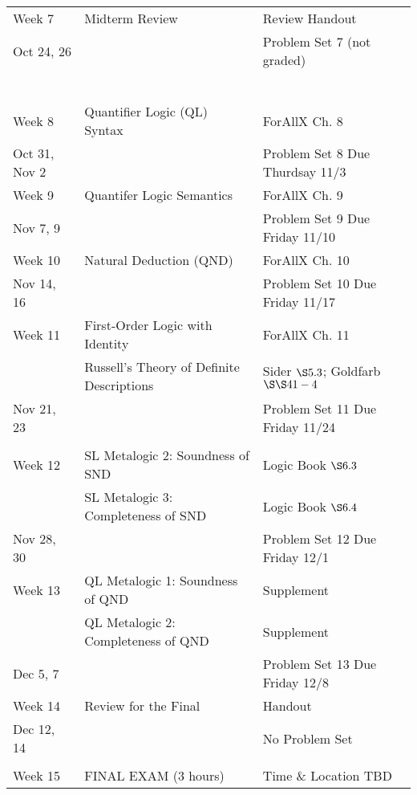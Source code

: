 \documentclass[letterpaper]{inzane_syllabus} %
\begin{document}
\begin{center}
\begin{tabularx}{\textwidth}{p{2.5cm}p{8cm}p{9cm}}
Week 7 & Midterm Review & Review Handout \\
Oct 24, 26 & &  Problem Set 7 (not graded) \\
~\\

\arrayrulecolor{myCOLOR}\hline

\multicolumn{2}{l}{\textbf{\textcolor{myCOLOR}{\large Part 2: Quantifer Logic (QL) }}} \\
\hline

Week 8 & Quantifier Logic (QL) Syntax & ForAllX Ch. 8 \\
Oct 31, Nov 2 & & Problem Set 8 Due Thurdsay 11/3 \\
\arrayrulecolor{maingray}\hline
 
Week 9 & Quantifer Logic Semantics & ForAllX Ch. 9 \\
Nov 7, 9 & & Problem Set 9 Due Friday 11/10 \\
\arrayrulecolor{maingray}\hline

Week 10 & Natural Deduction (QND) & ForAllX Ch. 10 \\
Nov 14, 16 & & Problem Set 10 Due Friday 11/17 \\
\arrayrulecolor{maingray}\hline

Week 11 & First-Order Logic with Identity & ForAllX Ch. 11 \\
& Russell's Theory of Definite Descriptions & Sider $\S 5.3$; Goldfarb $\S\S 41-4$ \\
Nov 21, 23 & & Problem Set 11 Due Friday 11/24 \\
\arrayrulecolor{maingray}\hline

\multicolumn{2}{l}{\textbf{\textcolor{myCOLOR}{\large Part 3: Metalogic }}} \\
\hline

Week 12 & SL Metalogic 2: Soundness of SND & Logic Book $\S6.3$ \\
& SL Metalogic 3: Completeness of SND & Logic Book $\S6.4$ \\
Nov 28, 30 & & Problem Set 12 Due Friday 12/1 \\
\arrayrulecolor{maingray}\hline

Week 13 & QL Metalogic 1: Soundness of QND & Supplement \\
& QL Metalogic 2: Completeness of QND & Supplement \\
Dec 5, 7 & & Problem Set 13 Due Friday 12/8 \\
\arrayrulecolor{maingray}\hline

Week 14 & Review for the Final & Handout \\
Dec 12, 14 & & No Problem Set \\

\arrayrulecolor{maingray}\hline\\

\arrayrulecolor{myCOLOR}\hline
Week 15 & FINAL EXAM (3 hours) & Time \& Location TBD \\ 
\hline 
\end{tabularx}
\end{center}


\end{document}
